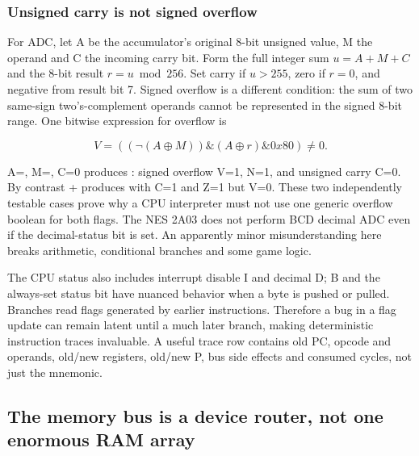 \subsubsection{Unsigned carry is not signed overflow}\label{06-engine-ii-ch042-unsigned-carry-is-not-signed-overflow}

\hypertarget{06-engine-ii-ch042-unsigned-carry-is-not-signed-overflow}{}

For ADC, let A be the accumulator's original 8-bit unsigned value, M the operand and C the incoming carry bit. Form the full integer sum \(u=A+M+C\) and the 8-bit result \(r=u\bmod256\). Set carry if \(u>255\), zero if \(r=0\), and negative from result bit 7. Signed overflow is a different condition: the sum of two same-sign two's-complement operands cannot be represented in the signed 8-bit range. One bitwise expression for overflow is

\[
V= ((\neg(A\oplus M))\mathbin{\&}(A\oplus r)\mathbin{\&}0x80)\ne0.
\]

A=, M=, C=0 produces : signed overflow V=1, N=1, and unsigned carry C=0. By contrast + produces  with C=1 and Z=1 but V=0. These two independently testable cases prove why a CPU interpreter must not use one generic overflow boolean for both flags. The NES 2A03 does not perform BCD decimal ADC even if the decimal-status bit is set. An apparently minor misunderstanding here breaks arithmetic, conditional branches and some game logic.

The CPU status also includes interrupt disable I and decimal D; B and the always-set status bit have nuanced behavior when a byte is pushed or pulled. Branches read flags generated by earlier instructions. Therefore a bug in a flag update can remain latent until a much later branch, making deterministic instruction traces invaluable. A useful trace row contains old PC, opcode and operands, old/new registers, old/new P, bus side effects and consumed cycles, not just the mnemonic.

\subsection{The memory bus is a device router, not one enormous RAM array}\label{06-engine-ii-ch042-the-memory-bus-is-a-device-router-not-one-enormous-ram-array}

\hypertarget{06-engine-ii-ch042-the-memory-bus-is-a-device-router-not-one-enormous-ram-array}{}


